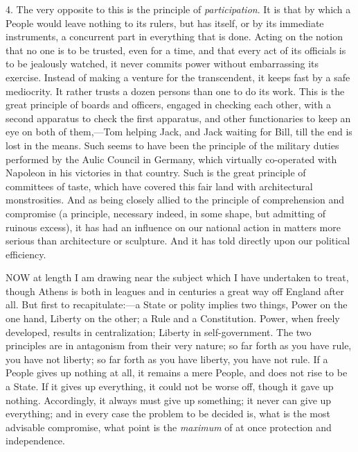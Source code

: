 4. The very opposite to this is the principle of \emph{participation}.
It is that by which a People would leave nothing to its rulers, but
has itself, or by its immediate instruments, a concurrent part in
everything that is done. Acting on the notion that no one is to be
trusted, even for a time, and that every act of its officials is to be
jealously watched, it never commits power without embarrassing its
exercise. Instead of making a venture for the transcendent, it keeps
fast by a safe mediocrity. It rather trusts a dozen persons than one
to do its work. This is the great principle of boards and officers,
engaged in checking each other, with a second apparatus to check the
first apparatus, and other functionaries to keep an eye on both of
them,—Tom helping Jack, and Jack waiting for Bill, till the end is
lost in the means. Such seems to have been the principle of the
military duties performed by the Aulic Council in Germany, which
virtually co-operated with Napoleon in his victories in that country.
Such is the great principle of committees of taste, which have covered
this fair land with architectural monstrosities. And as being closely
allied to the principle of comprehension and compromise (a
principle, necessary indeed, in some shape, but admitting of ruinous
excess), it has had an influence on our national action in matters
more serious than architecture or sculpture. And it has told directly
upon our political efficiency.


NOW
at length I am drawing near the subject which I have undertaken to
treat, though Athens is both in leagues and in centuries a great way
off England after all. But first to recapitulate:—a State or polity
implies two things, Power on the one hand, Liberty on the other; a
Rule and a Constitution. Power, when freely developed, results in
centralization; Liberty in self-government. The two principles are in
antagonism from their very nature; so far forth as you have rule, you
have not liberty; so far forth as you have liberty, you have not rule.
If a People gives up nothing at all, it remains a mere People, and
does not rise to be a State. If it gives up everything, it could not
be worse off, though it gave up nothing. Accordingly, it always must
give up something; it never can give up everything; and in every case
the problem to be decided is, what is the most advisable compromise,
what point is the \emph{maximum} of at once protection and
independence.

